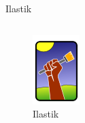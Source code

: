\documentclass{beamer}
\begin{document}
\begin{frame}{Ilastik}
\begin{columns}[T]
\begin{column}{.2\textwidth}
\begin{figure}[!ht]
\includegraphics[width=\textwidth]{Ilastik.png}
\caption{Ilastik}
\label{}
\end{figure}
\end{column}%
\end{columns}
\end{frame}
\end{document}
